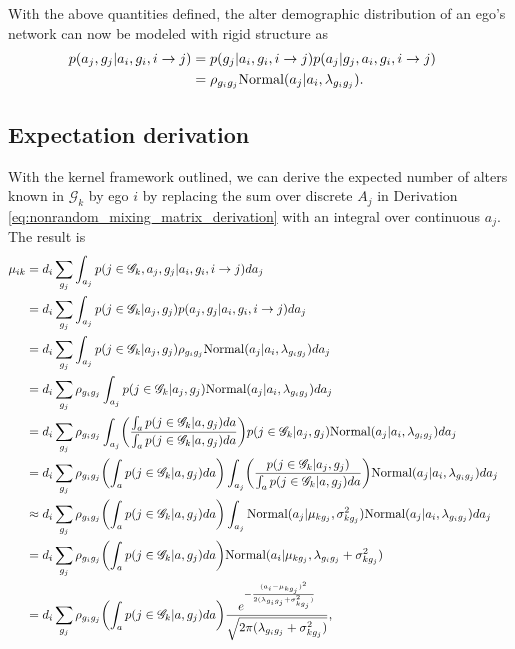 With the above quantities defined, the alter demographic distribution of an ego's network can now be modeled with rigid structure as
\begin{align}
p(a_j, g_j | a_i, g_i, i \to j)
&= p(g_j | a_i, g_i, i \to j) p(a_j | g_j, a_i, g_i, i \to j)  && \label{eq:nonrandom_mixing_kernel} \\\nonumber
&= \rho_{g_ig_j} \text{Normal}(a_j | a_i, \lambda_{g_ig_j}).
\end{align}

\subsection{Expectation derivation}
\label{subsec:nonrandom_mixing_kernel_expectation}

With the kernel framework outlined, we can derive the expected number of alters known in $\mathcal{G}_k$ by ego $i$ by replacing the sum over discrete $A_j$ in Derivation \ref{eq:nonrandom_mixing_matrix_derivation} with an integral over continuous $a_j$. The result is
\begin{align}
\mu_{ik} 
&= d_i \sum_{g_j} \int_{a_j} p( j \in \mathcal{G}_k, a_j, g_j | a_i, g_i, i \to j) da_j && \label{eq:nonrandom_mixing_kernel_derivation} \\\nonumber
&= d_i \sum_{g_j} \int_{a_j} p( j \in \mathcal{G}_k | a_j, g_j) p(a_j, g_j | a_i, g_i, i \to j) da_j && \\\nonumber
&= d_i \sum_{g_j} \int_{a_j} p( j \in \mathcal{G}_k | a_j, g_j) \rho_{g_ig_j} \text{Normal}(a_j | a_i, \lambda_{g_ig_j}) da_j && \\\nonumber
&= d_i \sum_{g_j} \rho_{g_ig_j} \int_{a_j} p( j \in \mathcal{G}_k | a_j, g_j) \text{Normal}(a_j | a_i, \lambda_{g_ig_j}) da_j && \\\nonumber
&= d_i \sum_{g_j} \rho_{g_ig_j} \int_{a_j} 
\biggl( \frac{ \int_{a} p( j \in \mathcal{G}_k | a, g_j) da }{ \int_{a} p( j \in \mathcal{G}_k | a, g_j) da } \biggr) 
p( j \in \mathcal{G}_k | a_j, g_j) \text{Normal}(a_j | a_i, \lambda_{g_ig_j}) da_j && \\\nonumber
&= d_i \sum_{g_j} \rho_{g_ig_j}
\biggl( \int_{a} p( j \in \mathcal{G}_k | a, g_j) da \biggr) 
\int_{a_j} \biggl( \frac{ p( j \in \mathcal{G}_k | a_j, g_j) }{ \int_{a} p( j \in \mathcal{G}_k | a, g_j) da } \biggr)
\text{Normal}(a_j | a_i, \lambda_{g_ig_j}) da_j && \\\nonumber
&\approx d_i \sum_{g_j} \rho_{g_ig_j} 
\biggl( \int_{a} p( j \in \mathcal{G}_k | a, g_j) da \biggr) 
\int_{a_j} \text{Normal}(a_j | \mu_{kg_j}, \sigma_{kg_j}^2)
\text{Normal}(a_j | a_i, \lambda_{g_ig_j}) da_j && \\\nonumber
&= d_i \sum_{g_j} \rho_{g_ig_j} 
\biggl( \int_{a} p( j \in \mathcal{G}_k | a, g_j) da \biggr) 
\text{Normal}(a_i | \mu_{kg_j}, \lambda_{g_ig_j} + \sigma_{kg_j}^2) && \\\nonumber
&= d_i \sum_{g_j} \rho_{g_ig_j} 
\biggl( \int_{a} p( j \in \mathcal{G}_k | a, g_j) da \biggr) 
\frac{ e^{ -\frac{ (a_i - \mu_{kg_j})^2 }{ 2(\lambda_{g_ig_j} + \sigma_{kg_j}^2) } } }{ \sqrt{ 2\pi(\lambda_{g_ig_j} + \sigma_{kg_j}^2) } },
\end{align}
